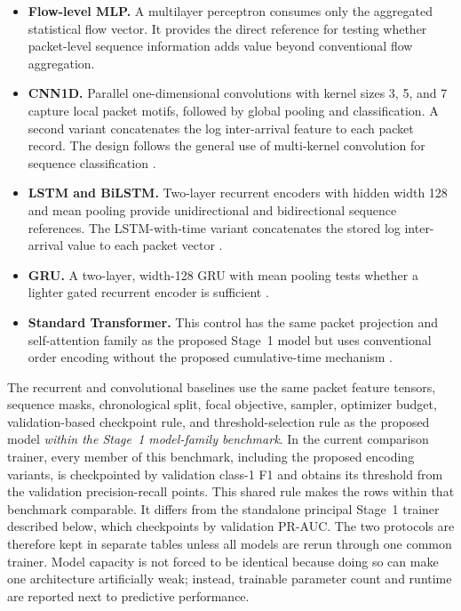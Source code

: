 \documentclass[11pt,fleqn]{report}
\begin{document}
\begin{itemize}[leftmargin=*]
    \item \textbf{Flow-level MLP.} A multilayer perceptron consumes only the
    aggregated statistical flow vector. It provides the direct reference for
    testing whether packet-level sequence information adds value beyond
    conventional flow aggregation.

    \item \textbf{CNN1D.} Parallel one-dimensional convolutions with kernel
    sizes 3, 5, and 7 capture local packet motifs, followed by global pooling
    and classification. A second variant concatenates the log inter-arrival
    feature to each packet record. The design follows the general use of
    multi-kernel convolution for sequence classification \cite{Kim2014CNN}.

    \item \textbf{LSTM and BiLSTM.} Two-layer recurrent encoders with hidden
    width 128 and mean pooling provide unidirectional and bidirectional
    sequence references. The LSTM-with-time variant concatenates the stored
    log inter-arrival value to each packet vector
    \cite{Hochreiter1997LSTM}.

    \item \textbf{GRU.} A two-layer, width-128 GRU with mean pooling tests
    whether a lighter gated recurrent encoder is sufficient
    \cite{Cho2014GRU}.

    \item \textbf{Standard Transformer.} This control has the same packet
    projection and self-attention family as the proposed Stage~1 model but
    uses conventional order encoding without the proposed cumulative-time
    mechanism \cite{Vaswani2017}.
\end{itemize}

The recurrent and convolutional baselines use the same packet feature tensors,
sequence masks, chronological split, focal objective, sampler, optimizer
budget, validation-based checkpoint rule, and threshold-selection rule as the
proposed model \emph{within the Stage~1 model-family benchmark}. In the current
comparison trainer, every member of this benchmark, including the proposed
encoding variants, is checkpointed by validation class-1 F1 and obtains its
threshold from the validation precision-recall points. This shared rule makes
the rows within that benchmark comparable. It differs from the standalone
principal Stage~1 trainer described below, which checkpoints by validation
PR-AUC. The two protocols are therefore kept in separate tables unless all
models are rerun through one common trainer. Model capacity is not forced to be
identical because doing so can make one architecture artificially weak;
instead, trainable parameter count and runtime are reported next to predictive
performance.
\end{document}
